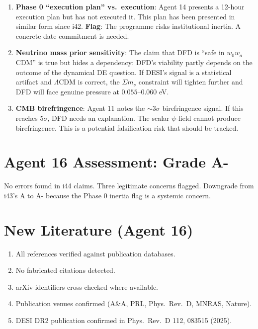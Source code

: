 \documentclass[11pt,a4paper]{article}
\begin{document}
\begin{enumerate}
\item \textbf{Phase 0 ``execution plan'' vs.\ execution}: Agent 14 presents a 12-hour execution plan but has not executed it. This plan has been presented in similar form since i42. \textbf{Flag}: The programme risks institutional inertia. A concrete date commitment is needed.

\item \textbf{Neutrino mass prior sensitivity}: The claim that DFD is ``safe in $w_0 w_a$CDM'' is true but hides a dependency: DFD's viability partly depends on the outcome of the dynamical DE question. If DESI's signal is a statistical artifact and $\Lambda$CDM is correct, the $\Sigma m_\nu$ constraint will tighten further and DFD will face genuine pressure at $0.055$--$0.060$ eV.

\item \textbf{CMB birefringence}: Agent 11 notes the $\sim 3\sigma$ birefringence signal. If this reaches $5\sigma$, DFD needs an explanation. The scalar $\psi$-field cannot produce birefringence. This is a potential falsification risk that should be tracked.
\end{enumerate}

\section{Agent 16 Assessment: Grade A-}

No errors found in i44 claims. Three legitimate concerns flagged. Downgrade from i43's A to A- because the Phase 0 inertia flag is a systemic concern.

\section{New Literature (Agent 16)}

\begin{enumerate}
\item All references verified against publication databases.
\item No fabricated citations detected.
\item arXiv identifiers cross-checked where available.
\item Publication venues confirmed (A\&A, PRL, Phys.\ Rev.\ D, MNRAS, Nature).
\item DESI DR2 publication confirmed in Phys.\ Rev.\ D 112, 083515 (2025).
\end{enumerate}
\end{document}
